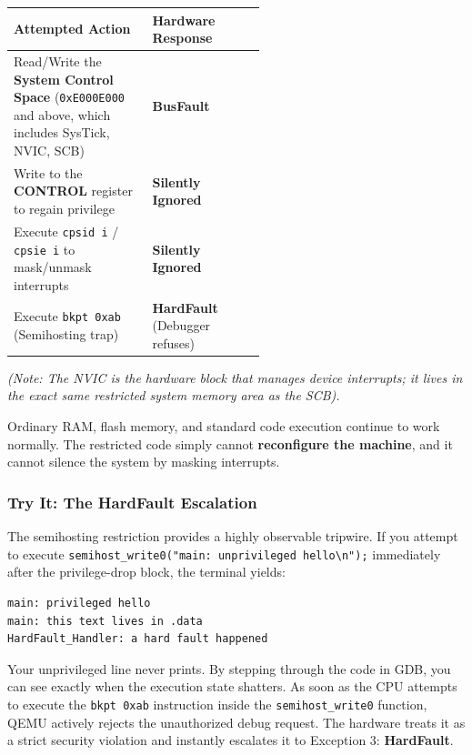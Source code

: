 \begin{table}[h!]
    \centering
    \begin{tabular}{|p{0.55\linewidth}|l|}
        \hline
        \textbf{Attempted Action} & \textbf{Hardware Response} \\ \hline
        Read/Write the \textbf{System Control Space} (\texttt{0xE000E000} and above, which includes SysTick, NVIC, SCB) & \textbf{BusFault} \\ \hline
        Write to the \textbf{CONTROL} register to regain privilege & \textbf{Silently Ignored} \\ \hline
        Execute \texttt{cpsid i} / \texttt{cpsie i} to mask/unmask interrupts & \textbf{Silently Ignored} \\ \hline
        Execute \texttt{bkpt 0xab} (Semihosting trap) & \textbf{HardFault} (Debugger refuses) \\ \hline
    \end{tabular}
\end{table}

\textit{(Note: The NVIC is the hardware block that manages device interrupts; it lives in the exact same restricted system memory area as the SCB).}

Ordinary RAM, flash memory, and standard code execution continue to work normally. The restricted code simply cannot \textbf{reconfigure the machine}, and it cannot silence the system by masking interrupts.

\subsubsection{Try It: The HardFault Escalation}
The semihosting restriction provides a highly observable tripwire. If you attempt to execute \texttt{semihost\_write0("main: unprivileged hello\textbackslash{}n");} immediately after the privilege-drop block, the terminal yields:

\begin{lstlisting}[language=bash]
main: privileged hello
main: this text lives in .data
HardFault_Handler: a hard fault happened
\end{lstlisting}

Your unprivileged line never prints. By stepping through the code in GDB, you can see exactly when the execution state shatters. As soon as the CPU attempts to execute the \texttt{bkpt 0xab} instruction inside the \texttt{semihost\_write0} function, QEMU actively rejects the unauthorized debug request. The hardware treats it as a strict security violation and instantly escalates it to Exception 3: \textbf{HardFault}.

